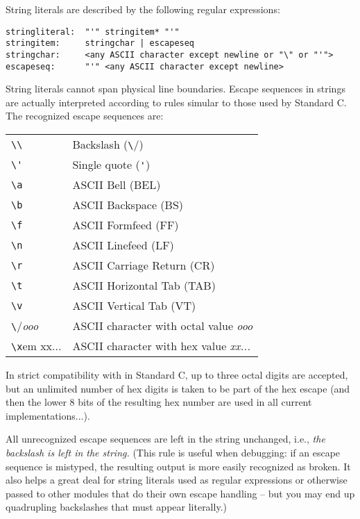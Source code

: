 String literals are described by the following regular expressions:

\begin{verbatim}
stringliteral:  "'" stringitem* "'"
stringitem:     stringchar | escapeseq
stringchar:     <any ASCII character except newline or "\" or "'">
escapeseq:      "'" <any ASCII character except newline>
\end{verbatim}

String literals cannot span physical line boundaries.  Escape
sequences in strings are actually interpreted according to rules
simular to those used by Standard C.  The recognized escape sequences
are:

\begin{center}
\begin{tabular}{|l|l|}
\hline
\verb/\\/	& Backslash (\verb/\/) \\
\verb/\'/	& Single quote (\verb/'/) \\
\verb/\a/	& ASCII Bell (BEL) \\
\verb/\b/	& ASCII Backspace (BS) \\
\verb/\f/	& ASCII Formfeed (FF) \\
\verb/\n/	& ASCII Linefeed (LF) \\
\verb/\r/	& ASCII Carriage Return (CR) \\
\verb/\t/	& ASCII Horizontal Tab (TAB) \\
\verb/\v/	& ASCII Vertical Tab (VT) \\
\verb/\/{\em ooo}	& ASCII character with octal value {\em ooo} \\
\verb/\x/{em xx...}	& ASCII character with hex value {\em xx...} \\
\hline
\end{tabular}
\end{center}

In strict compatibility with in Standard C, up to three octal digits are
accepted, but an unlimited number of hex digits is taken to be part of
the hex escape (and then the lower 8 bits of the resulting hex number
are used in all current implementations...).

All unrecognized escape sequences are left in the string unchanged,
i.e., {\em the backslash is left in the string.}  (This rule is
useful when debugging: if an escape sequence is mistyped, the
resulting output is more easily recognized as broken.  It also helps a
great deal for string literals used as regular expressions or
otherwise passed to other modules that do their own escape handling --
but you may end up quadrupling backslashes that must appear literally.)

